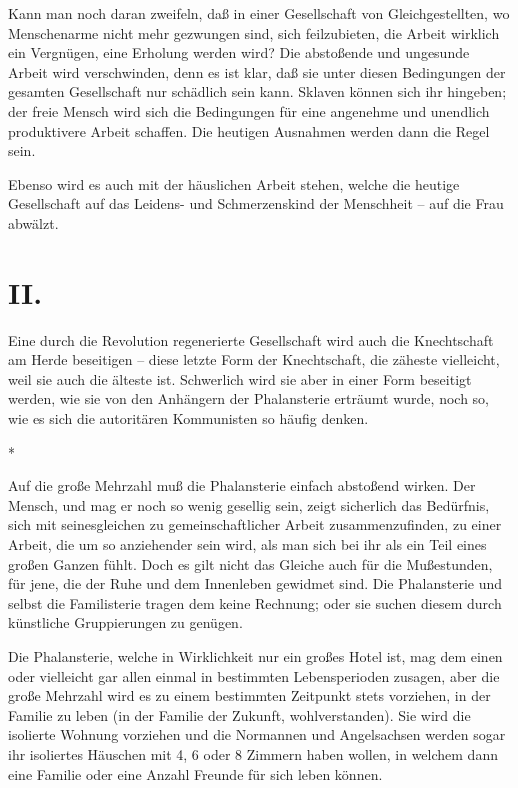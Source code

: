 \documentclass{scrbook}
\begin{document}
Kann man noch daran zweifeln, daß in einer Gesellschaft von Gleichgestellten, wo Menschenarme nicht mehr gezwungen sind, sich feilzubieten, die Arbeit wirklich ein Vergnügen, eine Erholung werden wird? Die abstoßende und ungesunde Arbeit wird verschwinden, denn es ist klar, daß sie unter diesen Bedingungen der gesamten Gesellschaft nur schädlich sein kann. Sklaven können sich ihr hingeben; der freie Mensch wird sich die Bedingungen für eine angenehme und unendlich produktivere Arbeit schaffen. Die heutigen Ausnahmen werden dann die Regel sein.

Ebenso wird es auch mit der häuslichen Arbeit stehen, welche die heutige Gesellschaft auf das Leidens- und Schmerzenskind der Menschheit – auf die Frau abwälzt.

\section*{II.}

Eine durch die Revolution regenerierte Gesellschaft wird auch die Knechtschaft am Herde beseitigen – diese letzte Form der Knechtschaft, die zäheste vielleicht, weil sie auch die älteste ist. Schwerlich wird sie aber in einer Form beseitigt werden, wie sie von den Anhängern der Phalansterie erträumt wurde, noch so, wie es sich die autoritären Kommunisten so häufig denken.

\begin{center}*\end{center}

Auf die große Mehrzahl muß die Phalansterie einfach abstoßend wirken. Der Mensch, und mag er noch so wenig gesellig sein, zeigt sicherlich das Bedürfnis, sich mit seinesgleichen zu gemeinschaftlicher Arbeit zusammenzufinden, zu einer Arbeit, die um so anziehender sein wird, als man sich bei ihr als ein Teil eines großen Ganzen fühlt. Doch es gilt nicht das Gleiche auch für die Mußestunden, für jene, die der Ruhe und dem Innenleben gewidmet sind. Die Phalansterie und selbst die Familisterie tragen dem keine Rechnung; oder sie suchen diesem durch künstliche Gruppierungen zu genügen.

Die Phalansterie, welche in Wirklichkeit nur ein großes Hotel ist, mag dem einen oder vielleicht gar allen einmal in bestimmten Lebensperioden zusagen, aber die große Mehrzahl wird es zu einem bestimmten Zeitpunkt stets vorziehen, in der Familie zu leben (in der Familie der Zukunft, wohlverstanden). Sie wird die isolierte Wohnung vorziehen und die Normannen und Angelsachsen werden sogar ihr isoliertes Häuschen mit 4, 6 oder 8 Zimmern haben wollen, in welchem dann eine Familie oder eine Anzahl Freunde für sich leben können.
\end{document}
